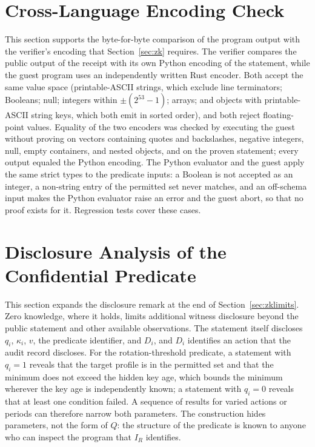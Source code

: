\section{Cross-Language Encoding Check}
\label{s:zkencoding}
This section supports the byte-for-byte comparison of the program output with the verifier's encoding that Section~\ref{sec:zk} requires. The verifier compares the public output of the receipt with its own Python encoding of the statement, while the guest program uses an independently written Rust encoder. Both accept the same value space (printable-ASCII strings, which exclude line terminators; Booleans; null; integers within $\pm(2^{53}-1)$; arrays; and objects with printable-ASCII string keys, which both emit in sorted order), and both reject floating-point values. Equality of the two encoders was checked by executing the guest without proving on vectors containing quotes and backslashes, negative integers, null, empty containers, and nested objects, and on the proven statement; every output equaled the Python encoding. The Python evaluator and the guest apply the same strict types to the predicate inputs: a Boolean is not accepted as an integer, a non-string entry of the permitted set never matches, and an off-schema input makes the Python evaluator raise an error and the guest abort, so that no proof exists for it. Regression tests cover these cases.

\section{Disclosure Analysis of the Confidential Predicate}
\label{s:zkprivacy}
This section expands the disclosure remark at the end of Section~\ref{sec:zklimits}. Zero knowledge, where it holds, limits additional witness disclosure beyond the public statement and other available observations. The statement itself discloses $q_i$, $\kappa_i$, $v$, the predicate identifier, and $D_i$, and $D_i$ identifies an action that the audit record discloses. For the rotation-threshold predicate, a statement with $q_i=1$ reveals that the target profile is in the permitted set and that the minimum does not exceed the hidden key age, which bounds the minimum wherever the key age is independently known; a statement with $q_i=0$ reveals that at least one condition failed. A sequence of results for varied actions or periods can therefore narrow both parameters. The construction hides parameters, not the form of $Q$: the structure of the predicate is known to anyone who can inspect the program that $I_R$ identifies.

